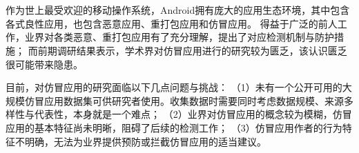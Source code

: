 \cleardoublepage{}

\chapter*{}
\vspace{-5mm}

\setlength{\baselineskip}{25pt} %

作为世上最受欢迎的移动操作系统，Android拥有庞大的应用生态环境，其中包含各式良性应用，也包含恶意应用、重打包应用和仿冒应用。
得益于广泛的前人工作，业界对各类恶意、重打包应用有了充分理解，提出了对应检测机制与防护措施；
而前期调研结果表示，学术界对仿冒应用进行的研究较为匮乏，该认识匮乏很可能带来隐患。

目前，对仿冒应用的研究面临以下几点问题与挑战：
（1）未有一个公开可用的大规模仿冒应用数据集可供研究者使用。收集数据时需要同时考虑数据规模、来源多样性与代表性，本身就是一个难点；
（2）业界对仿冒应用的概念较为模糊，仿冒应用的基本特征尚未明晰，阻碍了后续的检测工作；
（3）仿冒应用作者的行为特征不明确，无法为业界提供预防或拦截仿冒应用的适当建议。

